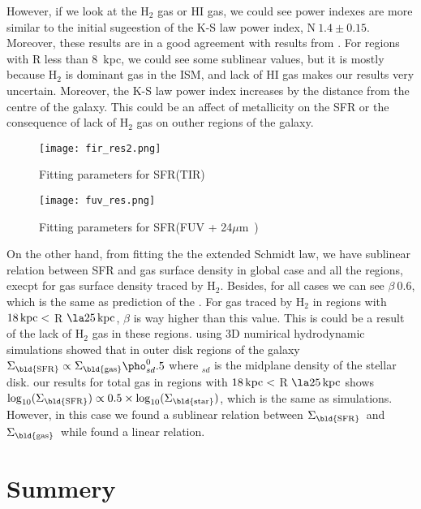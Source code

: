 \documentclass[useAMS,usenatbib]{mn2e}
\newcommand \kpc        {\,{\rm kpc}}
\newcommand \sigmagas    {$\Sigma_{\rm \bld {gas }}$\ }
\newcommand \eqsigmagas    {\Sigma_{\rm \bld {gas }}}
\newcommand \sigmasfr     {$\Sigma_{\rm \bld {SFR }}$\ }
\newcommand \eqsigmasfr     {\Sigma_{\rm \bld {SFR }}}
\newcommand \eqsigmastar    {\Sigma_{\rm \bld {star }}}
\newcommand \um    {$\mu$m\ }
\begin{document}
However, if we look at the H$_{2}$ gas or HI gas, we could see power indexes are more similar to the initial sugeestion of the K-S law power index, N$ ~ 1.4\pm 0.15 $. Moreover, these results are in a good agreement with results from \cite{tabatabyi10}. For regions with R less than 8 \kpc, we could see some sublinear values, but it is mostly because H$_2$ is dominant gas in the ISM, and lack of HI gas makes our results very uncertain. Moreover, the K-S law power index increases by the distance from the centre of the galaxy. This could be an affect of metallicity on the SFR or the consequence of lack of H$_2$ gas on outher regions of the galaxy.  

\begin{figure*}
\centering
\texttt{[image: fir\_res2.png]}
\caption{Fitting parameters for SFR(TIR) }
\label{fig:fir,params,fir}
\end{figure*}

\begin{figure*}
\centering
\texttt{[image: fuv\_res.png]}
\caption{Fitting parameters for SFR(FUV + 24\um ) }
\label{fig:fir,params,fuv}
\end{figure*}

On the other hand, from fitting the the extended Schmidt law, we have sublinear relation between SFR and gas surface density in global case and all the regions, execpt for gas surface density traced by H$_2$. Besides, for all cases we can see $\beta ~ 0.6$, which is the same as prediction of the \cite{Shi11}. For gas traced by H$_2$ in regions with $18\kpc <$ R $\la 25\kpc$, $\beta$ is way higher than this value. This is could be a result of the lack of H$_2$ gas in these regions. \cite{Kim13} using 3D numirical hydrodynamic simulations showed that in outer disk regions of the galaxy $\eqsigmasfr \propto \eqsigmagas \pho_{sd}^0.5$ where \pho$_{sd}$ is the midplane density of the stellar disk. our results for total gas in regions with $18\kpc <$ R $\la 25\kpc$ shows $\log_{10}(\eqsigmasfr) \propto 0.5 \times \log_{10}(\eqsigmastar)$, which is the same as simulations. However, in this case we found a sublinear relation between \sigmasfr and \sigmagas while \cite{Kim13} found a linear relation. 
\section{Summery}

\end{document}
